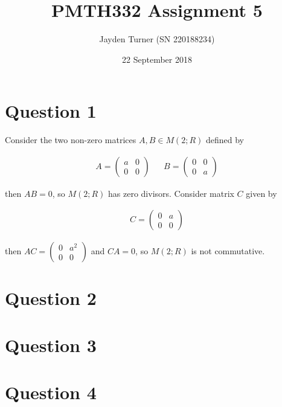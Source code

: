 \documentclass{article}
\title{PMTH332 Assignment 5}
\date{22 September 2018}
\author{Jayden Turner (SN 220188234)}
\begin{document}
\maketitle
{}

\section*{Question 1}

Consider the two non-zero matrices $A, B \in M(2; R)$ defined by

\begin{align*}
    A = \begin{pmatrix}
        a & 0\\
        0 & 0
    \end{pmatrix}
    &&
    B = \begin{pmatrix}
        0 & 0\\
        0 & a
    \end{pmatrix}
\end{align*}

then $AB = 0$, so $M(2; R)$ has zero divisors. Consider matrix $C$ given by

\begin{align*}
    C = \begin{pmatrix}
        0 & a\\
        0 & 0
    \end{pmatrix}
\end{align*}

then $AC = \begin{pmatrix}0 & a^2\\0 & 0\end{pmatrix}$ and $CA = 0$,
so $M(2; R)$ is not commutative.

\section*{Question 2}

\section*{Question 3}

\section*{Question 4}
\end{document}
